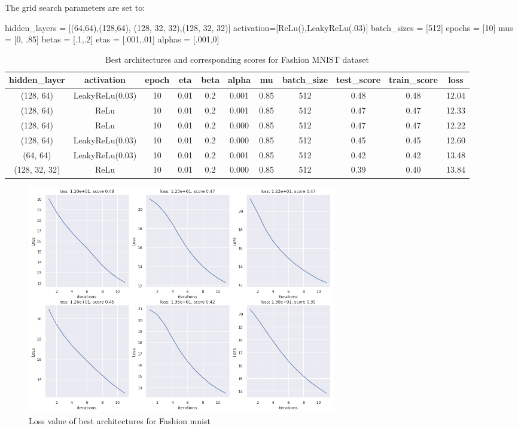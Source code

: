 \documentclass[10pt]{SelfArx} %
\begin{document}
The grid search parameters are set to:
\begin{python}
hidden_layers = [(64,64),(128,64),
(128, 32, 32),(128, 32, 32)]
activation=[ReLu(),LeakyReLu(.03)]
batch_sizes = [512]
epochs = [10]
mus = [0, .85]
betas = [.1,.2]
etas = [.001,.01]
alphas = [.001,0]
\end{python}
\begin{table}[]
  \begin{tabular*}{1\textwidth}{@{\extracolsep{\fill} }ccccccccccc@{}}
		\toprule
		hidden\_layer & activation & epoch & eta & beta & alpha & mu & batch\_size & test\_score & train\_score & loss \\ \midrule
		(128, 64) & LeakyReLu(0.03) & 10 & 0.01 & 0.2 & 0.001 & 0.85 & 512 & 0.48 & 0.48 & 12.04 \\
		(128, 64) & ReLu & 10 & 0.01 & 0.2 & 0.001 & 0.85 & 512 & 0.47 & 0.47 & 12.33 \\
		(128, 64) & ReLu & 10 & 0.01 & 0.2 & 0.000 & 0.85 & 512 & 0.47 & 0.47 & 12.22 \\
		(128, 64) & LeakyReLu(0.03) & 10 & 0.01 & 0.2 & 0.000 & 0.85 & 512 & 0.45 & 0.45 & 12.60 \\
		(64, 64) & LeakyReLu(0.03) & 10 & 0.01 & 0.2 & 0.001 & 0.85 & 512 & 0.42 & 0.42 & 13.48 \\
		(128, 32, 32) & ReLu & 10 & 0.01 & 0.2 & 0.000 & 0.85 & 512 & 0.39 & 0.40 & 13.84 \\ \bottomrule
	\end{tabular*}
\caption{Best architectures and corresponding scores for Fashion MNIST dataset}
\label{tfashion}
\end{table}
\begin{figure}\centering
	\includegraphics[width=1.79\columnwidth, height=10cm]{img/fashion-plots1}
	\caption{Loss value of best architectures for Fashion mnist}
	\label{ffashion}
\end{figure}
\end{document}
